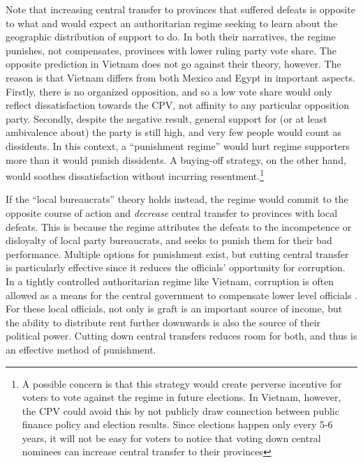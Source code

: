 \documentclass[12pt]{article}\usepackage[]{graphicx}\usepackage[]{color}
\newcommand{\1}{\mathbbm{1}}
\begin{document}
Note that increasing central transfer to provinces that suffered defeats is opposite to what \cite{Magaloni2006} and \cite{Blaydes2008} would expect an authoritarian regime seeking to learn about the geographic distribution of support to do. In both their narratives, the regime punishes, not compensates, provinces with lower ruling party vote share. The opposite prediction in Vietnam does not go against their theory, however. The reason is that Vietnam differs from both Mexico and Egypt in important aspects. Firstly, there is no organized opposition, and so a low vote share would only reflect dissatisfaction towards the CPV, not affinity to any particular opposition party. Secondly, despite the negative result, general support for (or at least ambivalence about) the party is still high, and very few people would count as dissidents. In this context, a ``punishment regime'' would hurt regime supporters more than it would punish dissidents. A  buying-off strategy, on the other hand, would soothes dissatisfaction without incurring resentment.\footnote{A possible concern is that this strategy would create perverse incentive for voters to vote against the regime in future elections. In Vietnam, however, the CPV could avoid this by not publicly draw connection between public finance policy and election results. Since elections happen only every 5-6 years, it will not be easy for voters to notice that voting down central nominees can increase central transfer to their provinces}

If the ``local bureaucrats'' theory holds instead, the regime would commit to the opposite course of action and \textit{decrease} central transfer to provinces with local defeats. This is because the regime attributes the defeats to the incompetence or disloyalty of local party bureaucrats, and seeks to punish them for their bad performance. Multiple options for punishment exist, but cutting central transfer is particularly effective since it reduces the officials' opportunity for corruption. In a tightly controlled authoritarian regime like Vietnam, corruption is often allowed as a means for the central government to compensate lower level officials \citep{Darden2008}. For these local officials, not only is graft is an important source of income, but the ability to distribute rent further downwards is also the source of their political power. Cutting down central transfers reduces room for both, and thus is an effective method of punishment.
\end{document}
